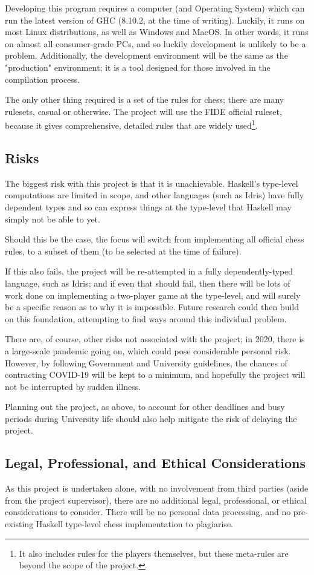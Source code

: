 \documentclass[12pt, a4paper]{scrartcl}
\begin{document}
Developing this program requires a computer (and Operating System) which can run the latest version of GHC (8.10.2, at the time of writing). Luckily, it runs on most Linux distributions, as well as Windows and MacOS. In other words, it runs on almost all consumer-grade PCs, and so luckily development is unlikely to be a problem. Additionally, the development environment will be the same as the "production" environment; it is a tool designed for those involved in the compilation process.

The only other thing required is a set of the rules for chess; there are many rulesets, casual or otherwise. The project will use the FIDE official ruleset, because it gives comprehensive, detailed rules that are widely used\footnote{It also includes rules for the players themselves, but these meta-rules are beyond the scope of the project.}.

\subsection{Risks}

The biggest risk with this project is that it is unachievable. Haskell's type-level computations are limited in scope, and other languages (such as Idris) have fully dependent types and so can express things at the type-level that Haskell may simply not be able to yet.

Should this be the case, the focus will switch from implementing all official chess rules, to a subset of them (to be selected at the time of failure).

If this also fails, the project will be re-attempted in a fully dependently-typed language, such as Idris; and if even that should fail, then there will be lots of work done on implementing a two-player game at the type-level, and will surely be a specific reason as to why it is impossible. Future research could then build on this foundation, attempting to find ways around this individual problem.

There are, of course, other risks not associated with the project; in 2020, there is a large-scale pandemic going on, which could pose considerable personal risk. However, by following Government and University guidelines, the chances of contracting COVID-19 will be kept to a minimum, and hopefully the project will not be interrupted by sudden illness.

Planning out the project, as above, to account for other deadlines and busy periods during University life should also help mitigate the risk of delaying the project.

\subsection{Legal, Professional, and Ethical Considerations}

As this project is undertaken alone, with no involvement from third parties (aside from the project supervisor), there are no additional legal, professional, or ethical considerations to consider. There will be no personal data processing, and no pre-existing Haskell type-level chess implementation to plagiarise.
\end{document}
